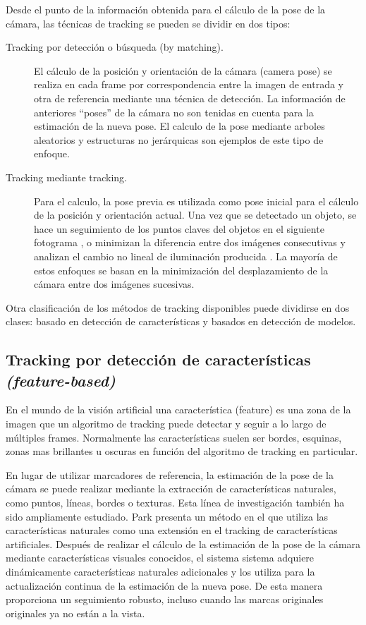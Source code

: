 Desde el punto de la información obtenida para el cálculo de la pose de la cámara, las técnicas de tracking se pueden se dividir en dos tipos:

\begin{description}
\item [Tracking por detección o búsqueda (by matching).] El cálculo de la posición y orientación de la cámara (camera pose) se realiza en cada frame por correspondencia entre la imagen de entrada y otra de referencia mediante una técnica de detección. La información de anteriores “poses” de la cámara no son tenidas en cuenta para la estimación de la nueva pose. El calculo de la pose mediante arboles aleatorios \cite{Lepetit} y estructuras no jerárquicas \cite{Ozuysal} son ejemplos de este tipo de enfoque.

\item [Tracking mediante tracking.] Para el calculo, la pose previa es utilizada como pose inicial para el cálculo de la posición y orientación actual. Una vez que se detectado un objeto, se hace un seguimiento de los puntos claves del objetos en el siguiente fotograma \cite{Wagner}, o minimizan la diferencia entre dos imágenes consecutivas \cite{Park} y analizan el cambio no lineal de iluminación producida \cite{Dame}. La mayoría de estos enfoques se basan en la minimización del desplazamiento de la cámara entre dos imágenes sucesivas.

\end{description}

Otra clasificación de los métodos de tracking disponibles puede dividirse en dos clases: basado en detección de características y basados en detección de modelos.

\subsection{Tracking por detección de características \emph{(feature-based)}}
En el mundo de la visión artificial una característica (feature) es una zona de la imagen que un algoritmo de tracking puede detectar y seguir a lo largo de múltiples frames. Normalmente las características suelen ser bordes, esquinas, zonas mas brillantes u oscuras en función del algoritmo de tracking en particular.

En lugar de utilizar marcadores de referencia, la estimación de la pose de la cámara se puede realizar mediante la extracción de características naturales, como puntos, líneas, bordes o texturas. Esta línea de investigación también ha sido ampliamente estudiado. Park \cite{Park3} presenta un método en el que utiliza las características naturales como una extensión en el tracking de características artificiales. Después de realizar el cálculo de la estimación de la pose de la cámara mediante características visuales conocidos, el sistema sistema adquiere dinámicamente características naturales adicionales y los utiliza para la actualización continua de la estimación de la nueva pose. De esta manera proporciona un seguimiento robusto, incluso cuando las marcas originales originales ya no están a la vista.

